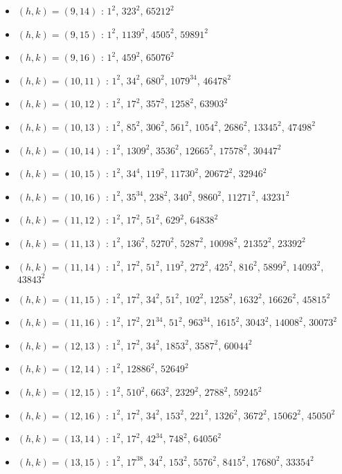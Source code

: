 \begin{itemize}
\item $(h,k)=(9,14)$ : $1^{2}$, $323^{2}$, $65212^{2}$
\item $(h,k)=(9,15)$ : $1^{2}$, $1139^{2}$, $4505^{2}$, $59891^{2}$
\item $(h,k)=(9,16)$ : $1^{2}$, $459^{2}$, $65076^{2}$
\item $(h,k)=(10,11)$ : $1^{2}$, $34^{2}$, $680^{2}$, $1079^{34}$, $46478^{2}$
\item $(h,k)=(10,12)$ : $1^{2}$, $17^{2}$, $357^{2}$, $1258^{2}$, $63903^{2}$
\item $(h,k)=(10,13)$ : $1^{2}$, $85^{2}$, $306^{2}$, $561^{2}$, $1054^{2}$, $2686^{2}$, $13345^{2}$, $47498^{2}$
\item $(h,k)=(10,14)$ : $1^{2}$, $1309^{2}$, $3536^{2}$, $12665^{2}$, $17578^{2}$, $30447^{2}$
\item $(h,k)=(10,15)$ : $1^{2}$, $34^{4}$, $119^{2}$, $11730^{2}$, $20672^{2}$, $32946^{2}$
\item $(h,k)=(10,16)$ : $1^{2}$, $35^{34}$, $238^{2}$, $340^{2}$, $9860^{2}$, $11271^{2}$, $43231^{2}$
\item $(h,k)=(11,12)$ : $1^{2}$, $17^{2}$, $51^{2}$, $629^{2}$, $64838^{2}$
\item $(h,k)=(11,13)$ : $1^{2}$, $136^{2}$, $5270^{2}$, $5287^{2}$, $10098^{2}$, $21352^{2}$, $23392^{2}$
\item $(h,k)=(11,14)$ : $1^{2}$, $17^{2}$, $51^{2}$, $119^{2}$, $272^{2}$, $425^{2}$, $816^{2}$, $5899^{2}$, $14093^{2}$, $43843^{2}$
\item $(h,k)=(11,15)$ : $1^{2}$, $17^{2}$, $34^{2}$, $51^{2}$, $102^{2}$, $1258^{2}$, $1632^{2}$, $16626^{2}$, $45815^{2}$
\item $(h,k)=(11,16)$ : $1^{2}$, $17^{2}$, $21^{34}$, $51^{2}$, $963^{34}$, $1615^{2}$, $3043^{2}$, $14008^{2}$, $30073^{2}$
\item $(h,k)=(12,13)$ : $1^{2}$, $17^{2}$, $34^{2}$, $1853^{2}$, $3587^{2}$, $60044^{2}$
\item $(h,k)=(12,14)$ : $1^{2}$, $12886^{2}$, $52649^{2}$
\item $(h,k)=(12,15)$ : $1^{2}$, $510^{2}$, $663^{2}$, $2329^{2}$, $2788^{2}$, $59245^{2}$
\item $(h,k)=(12,16)$ : $1^{2}$, $17^{2}$, $34^{2}$, $153^{2}$, $221^{2}$, $1326^{2}$, $3672^{2}$, $15062^{2}$, $45050^{2}$
\item $(h,k)=(13,14)$ : $1^{2}$, $17^{2}$, $42^{34}$, $748^{2}$, $64056^{2}$
\item $(h,k)=(13,15)$ : $1^{2}$, $17^{38}$, $34^{2}$, $153^{2}$, $5576^{2}$, $8415^{2}$, $17680^{2}$, $33354^{2}$

\end{itemize}
